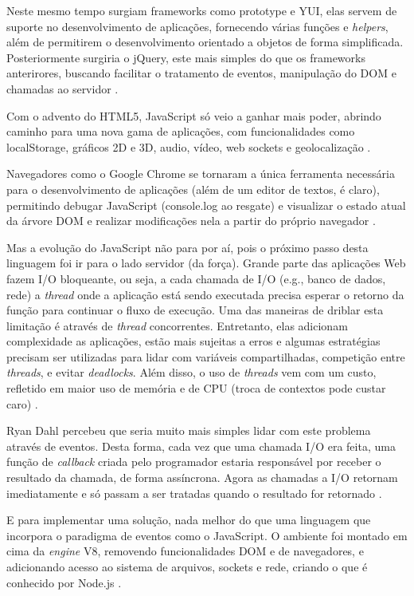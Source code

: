 \documentclass[diss]{template/setrem}
\begin{document}
Neste mesmo tempo surgiam frameworks como prototype e YUI, elas servem de suporte no desenvolvimento de aplicações, fornecendo várias funções e \emph{helpers}, além de permitirem o desenvolvimento orientado a objetos de forma simplificada. Posteriormente surgiria o jQuery, este mais simples do que os frameworks anterirores, buscando facilitar o tratamento de eventos, manipulação do DOM e chamadas ao servidor \citep{North2011}.

Com o advento do HTML5, JavaScript só veio a ganhar mais poder, abrindo caminho para uma nova gama de aplicações, com funcionalidades como localStorage, gráficos 2D e 3D, audio, vídeo, web sockets e geolocalização \citep{Pilgrim2010}.

Navegadores como o Google Chrome se tornaram a única ferramenta necessária para o desenvolvimento de aplicações (além de um editor de textos, é claro), permitindo debugar JavaScript (console.log ao resgate) e visualizar o estado atual da árvore DOM e realizar modificações nela a partir do próprio navegador \citep{North2011}.

Mas a evolução do JavaScript não para por aí, pois o próximo passo desta linguagem foi ir para o lado servidor (da força). Grande parte das aplicações Web fazem I/O bloqueante, ou seja, a cada chamada de I/O (e.g., banco de dados, rede) a \emph{thread} onde a aplicação está sendo executada precisa esperar o retorno da função para continuar o fluxo de execução. Uma das maneiras de driblar esta limitação é através de \emph{thread} concorrentes. Entretanto, elas adicionam complexidade as aplicações, estão mais sujeitas a erros e algumas estratégias precisam ser utilizadas para lidar com variáveis compartilhadas, competição entre \emph{threads}, e evitar \emph{deadlocks}. Além disso, o uso de \emph{threads} vem com um custo, refletido em maior uso de memória e de CPU (troca de contextos pode custar caro) \citep{Herron2011}.

Ryan Dahl percebeu que seria muito mais simples lidar com este problema através de eventos. Desta forma, cada vez que uma chamada I/O era feita, uma função de \emph{callback} criada pelo programador estaria responsável por receber o resultado da chamada, de forma assíncrona. Agora as chamadas a I/O retornam imediatamente e só passam a ser tratadas quando o resultado for retornado \citep{North2011}.

E para implementar uma solução, nada melhor do que uma linguagem que incorpora o paradigma de eventos como o JavaScript. O ambiente foi montado em cima da \emph{engine} V8, removendo funcionalidades DOM e de navegadores, e adicionando acesso ao sistema de arquivos, sockets e rede, criando o que é conhecido por Node.js \citep{North2011}.
\end{document}
